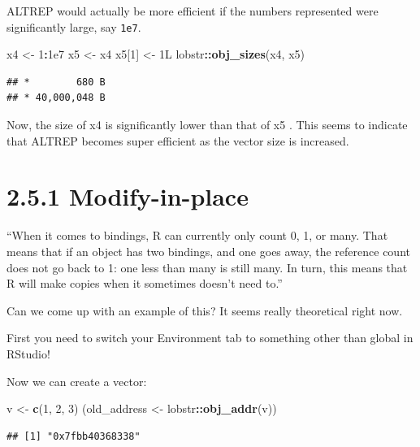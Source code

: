 \documentclass[]{book}
\newenvironment{Shaded}{\begin{snugshade}}{\end{snugshade}}
\newcommand{\DecValTok}[1]{\textcolor[rgb]{0.00,0.00,0.81}{#1}}
\newcommand{\FloatTok}[1]{\textcolor[rgb]{0.00,0.00,0.81}{#1}}
\newcommand{\KeywordTok}[1]{\textcolor[rgb]{0.13,0.29,0.53}{\textbf{#1}}}
\newcommand{\NormalTok}[1]{#1}
\newcommand{\OperatorTok}[1]{\textcolor[rgb]{0.81,0.36,0.00}{\textbf{#1}}}
\newcommand{\StringTok}[1]{\textcolor[rgb]{0.31,0.60,0.02}{#1}}
\begin{document}
ALTREP would actually be more efficient if the numbers represented were significantly large, say \texttt{1e7}.

\begin{Shaded}
\begin{Highlighting}[]
\NormalTok{x4 <-}\StringTok{ }\DecValTok{1}\OperatorTok{:}\FloatTok{1e7}
\NormalTok{x5 <-}\StringTok{ }\NormalTok{x4}
\NormalTok{x5[}\DecValTok{1}\NormalTok{] <-}\StringTok{ }\NormalTok{1L}
\NormalTok{lobstr}\OperatorTok{::}\KeywordTok{obj_sizes}\NormalTok{(x4, x5)}
\end{Highlighting}
\end{Shaded}

\begin{verbatim}
## *        680 B
## * 40,000,048 B
\end{verbatim}

Now, the size of x4 is significantly lower than that of x5 . This seems to indicate that ALTREP becomes super efficient as the vector size is increased.

\hypertarget{modify-in-place}{%
\section*{2.5.1 Modify-in-place}\label{modify-in-place}}

``When it comes to bindings, R can currently only count 0, 1, or many. That means that if an object has two bindings, and one goes away, the reference count does not go back to 1: one less than many is still many. In turn, this means that R will make copies when it sometimes doesn't need to.''

Can we come up with an example of this? It seems really theoretical right now.

First you need to switch your Environment tab to something other than global in RStudio!

Now we can create a vector:

\begin{Shaded}
\begin{Highlighting}[]
\NormalTok{v <-}\StringTok{ }\KeywordTok{c}\NormalTok{(}\DecValTok{1}\NormalTok{, }\DecValTok{2}\NormalTok{, }\DecValTok{3}\NormalTok{)}
\NormalTok{(old_address <-}\StringTok{ }\NormalTok{lobstr}\OperatorTok{::}\KeywordTok{obj_addr}\NormalTok{(v))}
\end{Highlighting}
\end{Shaded}

\begin{verbatim}
## [1] "0x7fbb40368338"
\end{verbatim}
\end{document}
